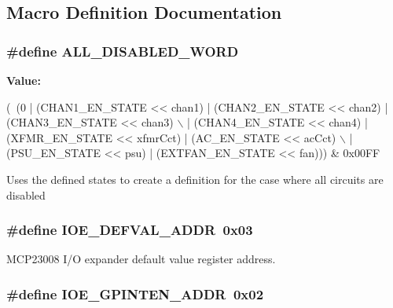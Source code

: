 \subsection{Macro Definition Documentation}
\hypertarget{a00023_a79846f375935e81b3781b88b40405d38}{
\subsubsection[{A\-L\-L\-\_\-\-D\-I\-S\-A\-B\-L\-E\-D\-\_\-\-W\-O\-R\-D}]{\setlength{\rightskip}{0pt plus 5cm}\#define A\-L\-L\-\_\-\-D\-I\-S\-A\-B\-L\-E\-D\-\_\-\-W\-O\-R\-D}}\label{a00023_a79846f375935e81b3781b88b40405d38}
{\bfseries Value\-:}
\begin{DoxyCode}
(~(0 | (CHAN1\_EN\_STATE << chan1) | (CHAN2\_EN\_STATE << chan2) | (CHAN3\_EN\_STATE << chan3) \(\backslash\)
                               | (CHAN4\_EN\_STATE << chan4) | (XFMR\_EN\_STATE << xfmrCct) | (AC\_EN\_STATE << 
      acCct) \(\backslash\)
                               | (PSU\_EN\_STATE << psu) | (EXTFAN\_EN\_STATE << fan))) & 0x00FF
\end{DoxyCode}
Uses the defined states to create a definition for the case where all circuits are disabled \hypertarget{a00023_a687e15212e8d4b49c12159dce73eeeab}{
\subsubsection[{I\-O\-E\-\_\-\-D\-E\-F\-V\-A\-L\-\_\-\-A\-D\-D\-R}]{\setlength{\rightskip}{0pt plus 5cm}\#define I\-O\-E\-\_\-\-D\-E\-F\-V\-A\-L\-\_\-\-A\-D\-D\-R~0x03}}\label{a00023_a687e15212e8d4b49c12159dce73eeeab}
M\-C\-P23008 I/\-O expander default value register address. \hypertarget{a00023_aa68be5a6ed28fb146600b4fd2d11fafd}{
\subsubsection[{I\-O\-E\-\_\-\-G\-P\-I\-N\-T\-E\-N\-\_\-\-A\-D\-D\-R}]{\setlength{\rightskip}{0pt plus 5cm}\#define I\-O\-E\-\_\-\-G\-P\-I\-N\-T\-E\-N\-\_\-\-A\-D\-D\-R~0x02}}\label{a00023_aa68be5a6ed28fb146600b4fd2d11fafd}
